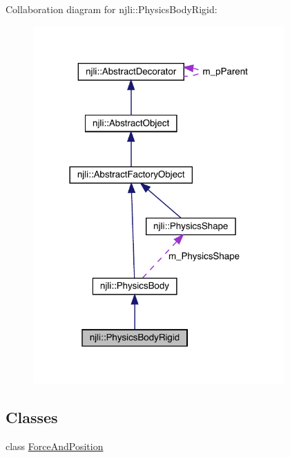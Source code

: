 Collaboration diagram for njli\+:\+:Physics\+Body\+Rigid\+:\nopagebreak
\begin{figure}[H]
\begin{center}
\leavevmode
\includegraphics[width=273pt]{classnjli_1_1_physics_body_rigid__coll__graph}
\end{center}
\end{figure}
\subsection*{Classes}
\begin{DoxyCompactItemize}
\item 
class \mbox{\hyperlink{classnjli_1_1_physics_body_rigid_1_1_force_and_position}{Force\+And\+Position}}
\end{DoxyCompactItemize}
